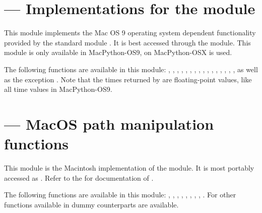 \section{ ---
         Implementations for the  module}



This module implements the Mac OS 9 operating system dependent functionality
provided by the standard module .  It is
best accessed through the  module. This module is only available in
MacPython-OS9, on MacPython-OSX  is used.

The following functions are available in this module:
,
,
,
,
,
,
,
,
,
,
,
,
,
,
,
,
as well as the exception . Note that the times
returned by  are floating-point values, like all time
values in MacPython-OS9.

\section{ ---
         MacOS path manipulation functions}



This module is the Macintosh implementation of the 
module.  It is most portably accessed as
.  Refer to the
 for
documentation of .

The following functions are available in this module:
,
,
,
,
,
,
,
,
.
For other functions available in  dummy counterparts
are available.
